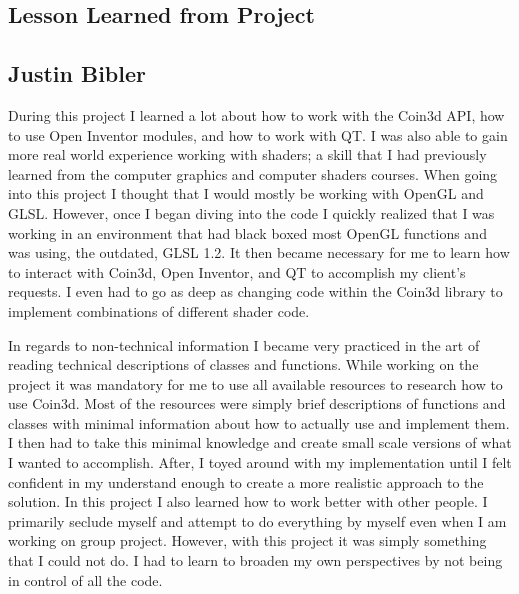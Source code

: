 \documentclass[10pt,journal,compsoc,draftclsnofoot]{IEEEtran}
\begin{document}
\begin{flushleft}
\newpage

\section{Lesson Learned from Project}

\subsection{Justin Bibler}
During this project I learned a lot about how to work with the Coin3d API, how to use Open Inventor modules, and how to work with QT.
I was also able to gain more real world experience working with shaders; a skill that I had previously learned from the computer graphics and computer shaders courses.
When going into this project I thought that I would mostly be working with OpenGL and GLSL.
However, once I began diving into the code I quickly realized that I was working in an environment that had black boxed most OpenGL functions and was using, the outdated, GLSL 1.2.
It then became necessary for me to learn how to interact with Coin3d, Open Inventor, and QT to accomplish my client's requests.
I even had to go as deep as changing code within the Coin3d library to implement combinations of different shader code.\par
\vspace{3mm}
In regards to non-technical information I became very practiced in the art of reading technical descriptions of classes and functions.
While working on the project it was mandatory for me to use all available resources to research how to use Coin3d.
Most of the resources were simply brief descriptions of functions and classes with minimal information about how to actually use and implement them.
I then had to take this minimal knowledge and create small scale versions of what I wanted to accomplish.
After, I toyed around with my implementation until I felt confident in my understand enough to create a more realistic approach to the solution.
In this project I also learned how to work better with other people.
I primarily seclude myself and attempt to do everything by myself even when I am working on group project.
However, with this project it was simply something that I could not do.
I had to learn to broaden my own perspectives by not being in control of all the code. \par

\end{flushleft}
\end{document}
